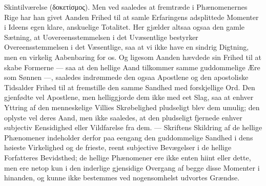 \documentclass[12pt]{book}
\newcommand{\opage}[1]{\marginnote{\footnotesize\textit{[#1]}}}
\begin{document}
Skintilværelse (δοκετίσμος). Men ved saaledes at fremtræde i Phænomenernes Rige
har han givet Aanden Frihed til at samle Erfaringens adsplittede Momenter i
Ideens egen klare, anskuelige Totalitet. Her gjælder altsaa ogsaa den gamle
Sætning, at Uovereensstemmelsen i det Uvæsentlige bestyrker Overeensstemmelsen i
det Væsentlige, saa at vi ikke have en sindrig Digtning, men en virkelig
Aabenbaring for os. Og ligesom Aanden hævdede sin Frihed til at skabe Formerne
--- saa at den hellige Aand tilkommer samme guddommelige Ære som Sønnen ---,
saaledes indrømmede den ogsaa Apostlene og den apostoliske Tidsalder Frihed til
at fremstille den samme Sandhed med forskjellige Ord. Den gjenfødte vel
Apostlene, men helliggjorde dem ikke med eet Slag, saa at enhver Yttring af den
menneskelige Villies
\opage{160} %
Skrøbelighed pludseligt blev dem umulig; den oplyste vel deres Aand, men ikke
saaledes, at den pludseligt fjernede enhver subjectiv Eensidighed eller
Vildfarelse fra dem. --- Skriftens Skildring af de hellige Phænomener indeholder
derfor paa eengang den guddommelige Sandhed i dens høieste Virkelighed og de
frieste, reent subjective Bevægelser i de hellige Forfatteres Bevidsthed; de
hellige Phænomener ere ikke enten hiint eller dette, men ere netop kun i den
inderlige gjensidige Overgang af begge disse Momenter i hinanden, og kunne ikke
bestemmes ved nogensomhelst udvortes Grændse.
\end{document}
